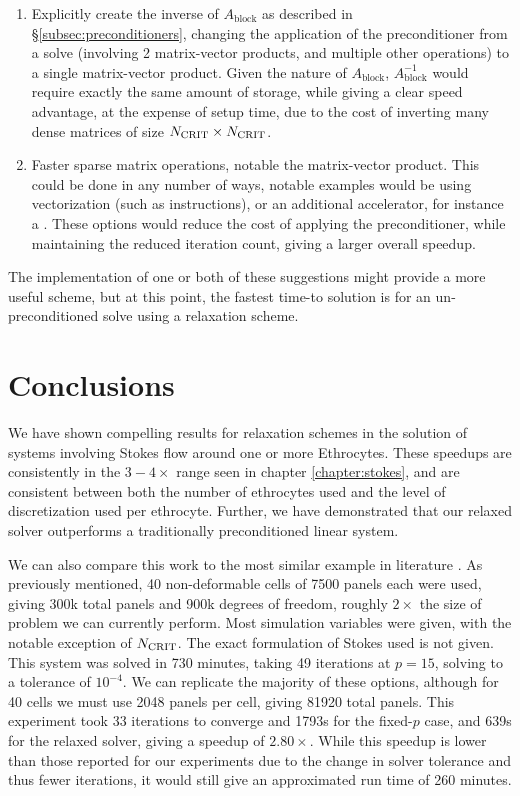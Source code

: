 \begin{enumerate}
\item Explicitly create the inverse of $A_{\text{block}}$ as described in \S\ref{subsec:preconditioners}, changing the application of the preconditioner from a {\gmres} solve (involving 2 matrix-vector products, and multiple other operations) to a single matrix-vector product. Given the nature of $A_{\text{block}}$, $A^{-1}_{\text{block}}$ would require exactly the same amount of storage, while giving a clear speed advantage, at the expense of setup time, due to the cost of inverting many dense matrices of size $N_{\text{CRIT}}
\times N_{\text{CRIT}}$.

\item Faster sparse matrix operations, notable the matrix-vector product. This could be done in any number of ways, notable examples would be using vectorization (such as {\sse} instructions), or an additional accelerator, for instance a {\gpu}. These options would reduce the cost of applying the preconditioner, while maintaining the reduced iteration count, giving a larger overall speedup.

\end{enumerate}

The implementation of one or both of these suggestions might provide a more useful scheme, but at this point, the fastest time-to solution is for an un-preconditioned solve using a relaxation scheme.

\section{Conclusions}\label{sec:rbc_conclusions}

We have shown compelling results for relaxation schemes in the solution of systems involving Stokes flow around one or more Ethrocytes. These speedups are consistently in the $3-4\times$ range seen in chapter \ref{chapter:stokes}, and are consistent between both the number of ethrocytes used and the level of discretization used per ethrocyte. Further, we have demonstrated that our relaxed solver outperforms a traditionally preconditioned linear system. 

We can also compare this work to the most similar example in literature \cite{Liu2009}. As previously mentioned, 40 non-deformable cells of 7500 panels each were used, giving 300k total panels and 900k degrees of freedom, roughly $2\times$ the size of problem we can currently perform. Most simulation variables were given, with the notable exception of $N_{\text{CRIT}}$. The exact formulation of Stokes {\bem} used is not given. This system was solved in 730 minutes, taking 49 iterations at $p=15$, solving to a tolerance of $10^{-4}$. We can replicate the majority of these options, although for 40 cells we must use 2048 panels per cell, giving 81920 total panels. This experiment took 33 iterations to converge and 1793s for the fixed-$p$ case, and 639s for the relaxed solver, giving a speedup of $2.80\times$. While this speedup is lower than those reported for our experiments due to the change in solver tolerance and thus fewer iterations, it would still give an approximated run time of 260 minutes.

